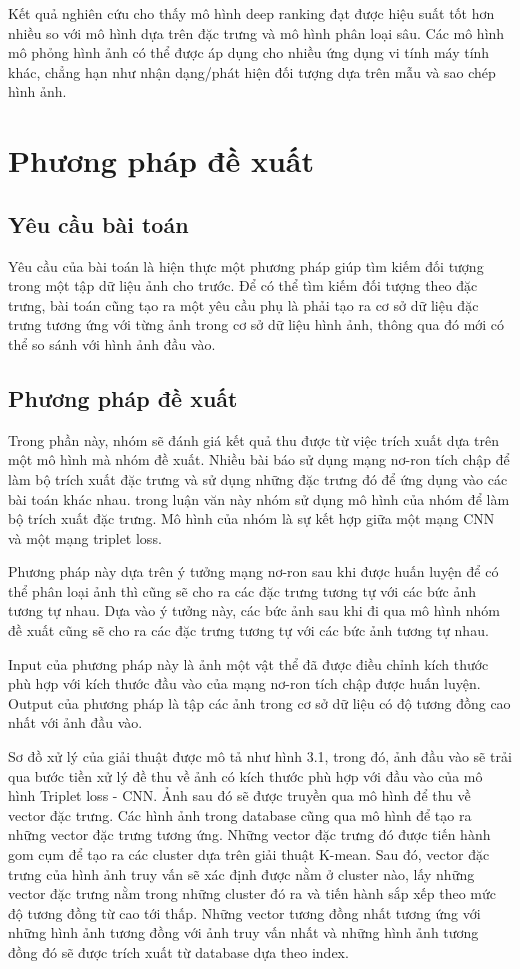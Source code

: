 \documentclass[a4paper,14pt]{extreport}
\begin{document}
Kết quả nghiên cứu cho thấy mô hình deep ranking đạt được hiệu suất tốt hơn nhiều so với mô hình dựa trên đặc trưng và mô hình phân loại sâu. Các mô hình mô phỏng hình ảnh có thể được áp dụng cho nhiều ứng dụng vi tính máy tính khác, chẳng hạn như nhận dạng/phát hiện đối tượng dựa trên mẫu và sao chép hình ảnh.


\chapter{Phương pháp đề xuất}
\section{Yêu cầu bài toán}
Yêu cầu của bài toán là hiện thực một phương pháp giúp tìm kiếm đối tượng trong một tập dữ liệu ảnh cho trước. 
Để có thể tìm kiếm đối tượng theo đặc trưng, bài toán cũng tạo ra một yêu cầu phụ là phải tạo ra cơ sở 
dữ liệu đặc trưng tương ứng với từng ảnh trong cơ sở dữ liệu hình ảnh, thông qua đó mới có thể so sánh 
với hình ảnh đầu vào.

\section{ Phương pháp đề xuất }

Trong phần này, nhóm sẽ đánh giá kết quả thu được từ việc trích xuất dựa trên một mô hình mà nhóm đề xuất. Nhiều bài báo sử dụng mạng nơ-ron tích chập để làm bộ trích xuất đặc trưng và sử dụng những đặc trưng đó để ứng dụng vào các bài toán khác nhau. trong luận văn này nhóm sử dụng mô hình của nhóm để làm bộ trích xuất đặc trưng. Mô hình của nhóm là sự kết hợp giữa một mạng CNN và một mạng triplet loss.

Phương pháp này dựa trên ý tưởng mạng nơ-ron sau khi được huấn luyện để có thể phân loại ảnh thì cũng sẽ cho 
ra các đặc trưng tương tự với các bức ảnh tương tự nhau. Dựa vào ý tưởng này, các bức ảnh sau khi đi qua mô hình nhóm đề xuất cũng sẽ cho ra các đặc trưng tương tự với các bức ảnh tương tự nhau.

Input của phương pháp này là ảnh một vật thể đã được điều chỉnh kích thước phù hợp với kích thước đầu vào của mạng nơ-ron tích chập được huấn luyện. Output của phương pháp là tập các ảnh trong cơ sở dữ liệu có độ tương đồng cao nhất với ảnh đầu vào.

Sơ đồ xử lý của giải thuật được mô tả như hình 3.1, trong đó, ảnh đầu vào sẽ trải qua bước tiền xử lý đề thu về ảnh có kích thước phù hợp với đầu vào của mô hình Triplet loss - CNN. Ảnh sau đó sẽ được truyền qua mô hình để thu về vector đặc trưng. Các hình ảnh trong database cũng qua mô hình để tạo ra những vector đặc trưng tương ứng. Những vector đặc trưng đó được tiến hành gom cụm để tạo ra các cluster dựa trên giải thuật K-mean. Sau đó, vector đặc trưng của hình ảnh truy vấn sẽ xác định được nằm ở cluster nào, lấy những vector đặc trưng nằm trong những cluster đó ra và tiến hành sắp xếp theo mức độ tương đồng từ cao tới thấp. Những vector tương đồng nhất tương ứng với những hình ảnh tương đồng với ảnh truy vấn nhất và những hình ảnh tương đồng đó sẽ được trích xuất từ database dựa theo index.
\end{document}
